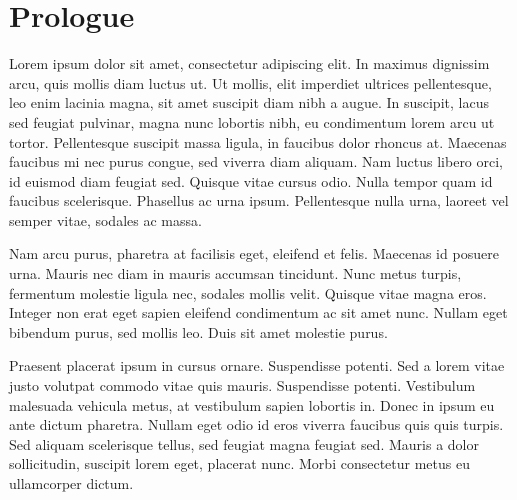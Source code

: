 \chapter*{Prologue}

Lorem ipsum dolor sit amet, consectetur adipiscing elit. In maximus dignissim
arcu, quis mollis diam luctus ut. Ut mollis, elit imperdiet ultrices
pellentesque, leo enim lacinia magna, sit amet suscipit diam nibh a augue. In
suscipit, lacus sed feugiat pulvinar, magna nunc lobortis nibh, eu condimentum
lorem arcu ut tortor. Pellentesque suscipit massa ligula, in faucibus dolor
rhoncus at. Maecenas faucibus mi nec purus congue, sed viverra diam aliquam. Nam
luctus libero orci, id euismod diam feugiat sed. Quisque vitae cursus odio.
Nulla tempor quam id faucibus scelerisque. Phasellus ac urna ipsum. Pellentesque
nulla urna, laoreet vel semper vitae, sodales ac massa.

Nam arcu purus, pharetra at facilisis eget, eleifend et felis. Maecenas id
posuere urna. Mauris nec diam in mauris accumsan tincidunt. Nunc metus turpis,
fermentum molestie ligula nec, sodales mollis velit. Quisque vitae magna eros.
Integer non erat eget sapien eleifend condimentum ac sit amet nunc. Nullam eget
bibendum purus, sed mollis leo. Duis sit amet molestie purus.

Praesent placerat ipsum in cursus ornare. Suspendisse potenti. Sed a lorem vitae
justo volutpat commodo vitae quis mauris. Suspendisse potenti. Vestibulum
malesuada vehicula metus, at vestibulum sapien lobortis in. Donec in ipsum eu
ante dictum pharetra. Nullam eget odio id eros viverra faucibus quis quis
turpis. Sed aliquam scelerisque tellus, sed feugiat magna feugiat sed. Mauris a
dolor sollicitudin, suscipit lorem eget, placerat nunc. Morbi consectetur metus
eu ullamcorper dictum. 
